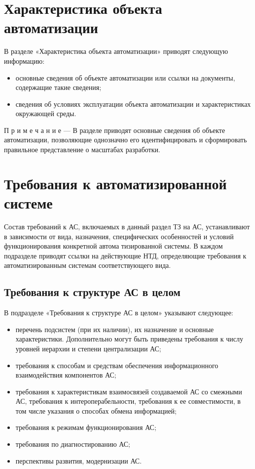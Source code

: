 {\section{Характеристика объекта автоматизации}
В разделе «Характеристика объекта автоматизации» приводят следующую информацию:
\begin{itemize}
  \item основные сведения об объекте автоматизации или ссылки на документы, содержащие такие сведения;
  \item сведения об условиях эксплуатации объекта автоматизации и характеристиках окружающей среды.
\end{itemize}
П р и м е ч а н и е — В разделе приводят основные сведения об объекте автоматизации, позволяющие однозначно его идентифицировать и сформировать правильное представление о масштабах разработки.

\section{Требования к автоматизированной системе}
Состав требований к АС, включаемых в данный раздел ТЗ на АС, устанавливают в зависимости от вида, назначения, специфических особенностей и условий функционирования конкретной автома тизированной системы. В каждом подразделе приводят ссылки на действующие НТД, определяющие требования к автоматизированным системам соответствующего вида.
\subsection{Требования к структуре АС в целом}
В подразделе «Требования к структуре АС в целом» указывают следующее:
\begin{itemize}
  \item перечень подсистем (при их наличии), их назначение и основные характеристики. Дополнительно могут быть приведены требования к числу уровней иерархии и степени централизации АС;
  \item требования к способам и средствам обеспечения информационного взаимодействия компонентов АС;
  \item требования к характеристикам взаимосвязей создаваемой АС со смежными АС, требования к интероперабельности, требования к ее совместимости, в том числе указания о способах обмена информацией;
  \item требования к режимам функционирования АС;
  \item требования по диагностированию АС;
  \item перспективы развития, модернизации АС.
\end{itemize}
}
